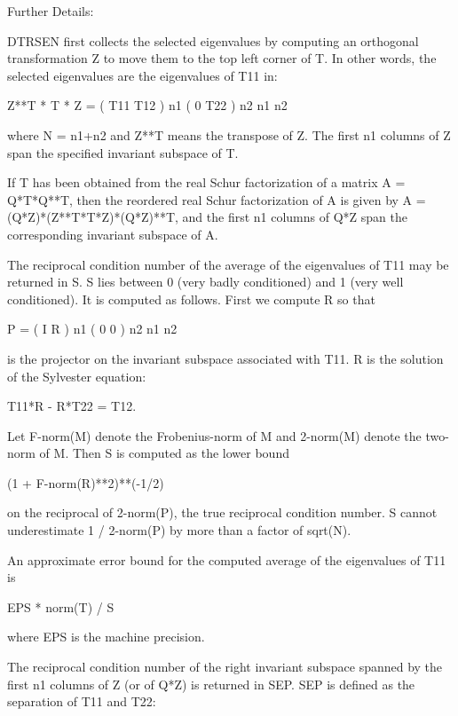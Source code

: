 \begin{DoxyParagraph}{Further Details\+: }
\begin{DoxyVerb}  DTRSEN first collects the selected eigenvalues by computing an
  orthogonal transformation Z to move them to the top left corner of T.
  In other words, the selected eigenvalues are the eigenvalues of T11
  in:

          Z**T * T * Z = ( T11 T12 ) n1
                         (  0  T22 ) n2
                            n1  n2

  where N = n1+n2 and Z**T means the transpose of Z. The first n1 columns
  of Z span the specified invariant subspace of T.

  If T has been obtained from the real Schur factorization of a matrix
  A = Q*T*Q**T, then the reordered real Schur factorization of A is given
  by A = (Q*Z)*(Z**T*T*Z)*(Q*Z)**T, and the first n1 columns of Q*Z span
  the corresponding invariant subspace of A.

  The reciprocal condition number of the average of the eigenvalues of
  T11 may be returned in S. S lies between 0 (very badly conditioned)
  and 1 (very well conditioned). It is computed as follows. First we
  compute R so that

                         P = ( I  R ) n1
                             ( 0  0 ) n2
                               n1 n2

  is the projector on the invariant subspace associated with T11.
  R is the solution of the Sylvester equation:

                        T11*R - R*T22 = T12.

  Let F-norm(M) denote the Frobenius-norm of M and 2-norm(M) denote
  the two-norm of M. Then S is computed as the lower bound

                      (1 + F-norm(R)**2)**(-1/2)

  on the reciprocal of 2-norm(P), the true reciprocal condition number.
  S cannot underestimate 1 / 2-norm(P) by more than a factor of
  sqrt(N).

  An approximate error bound for the computed average of the
  eigenvalues of T11 is

                         EPS * norm(T) / S

  where EPS is the machine precision.

  The reciprocal condition number of the right invariant subspace
  spanned by the first n1 columns of Z (or of Q*Z) is returned in SEP.
  SEP is defined as the separation of T11 and T22:


\end{DoxyVerb}
\end{DoxyParagraph}
